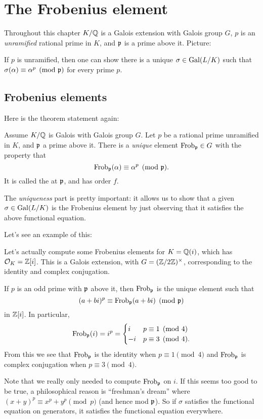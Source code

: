 \chapter{The Frobenius element}
Throughout this chapter $K/\mathbb Q$ is a Galois extension with Galois group $G$,
$p$ is an \emph{unramified} rational prime in $K$, and $\mathfrak p$ is a prime above it.
Picture:
\begin{center}
\end{center}
If $p$ is unramified, then one can show there
is a unique $\sigma \in \operatorname{Gal}(L/K)$ such that
$\sigma(\alpha) \equiv \alpha^p \pmod{\mathfrak p}$ for every prime $p$.

\section{Frobenius elements}

Here is the theorem statement again:
\begin{theorem}
	Assume $K/\mathbb Q$ is Galois with Galois group $G$.
	Let $p$ be a rational prime unramified in $K$, and $\mathfrak p$ a prime above it.
	There is a \emph{unique} element $\mathrm{Frob}_\mathfrak p \in G$
	with the property that
	\[ \mathrm{Frob}_\mathfrak p(\alpha) \equiv \alpha^{p} \pmod{\mathfrak p}. \]
	It is called the  at $\mathfrak p$, and has order $f$.
\end{theorem}
The \emph{uniqueness} part is pretty important:
it allows us to show that a given $\sigma \in \operatorname{Gal}(L/K)$
is the Frobenius element by just observing that it satisfies
the above functional equation.

Let's see an example of this:
\begin{example}
	Let's actually compute some Frobenius elements for $K = \mathbb Q(i)$,
	which has $\mathcal O_K = \mathbb Z[i]$.
	This is a Galois extension, with $G = (\mathbb Z/2\mathbb Z)^\times$,
	corresponding to the identity and complex conjugation.

	If $p$ is an odd prime with $\mathfrak p$ above it,
	then $\mathrm{Frob}_\mathfrak p$ is the unique element such that
	\[ (a+bi)^p \equiv \mathrm{Frob}_\mathfrak p(a+bi) \pmod{\mathfrak p} \]
	in $\mathbb Z[i]$. In particular,
	\[ \mathrm{Frob}_\mathfrak p(i) = i^p = 
		\begin{cases}
			i & p \equiv 1 \pmod 4 \\
			-i & p \equiv 3 \pmod 4.
		\end{cases}
	\]
	From this we see that $\mathrm{Frob}_\mathfrak p$ is the identity when $p \equiv 1 \pmod 4$
	and $\mathrm{Frob}_\mathfrak p$ is complex conjugation when $p \equiv 3 \pmod 4$.
\end{example}
Note that we really only needed to compute $\mathrm{Frob}_\mathfrak p$ on $i$.
If this seems too good to be true,
a philosophical reason is ``freshman's dream''
where $(x+y)^p \equiv x^p + y^p \pmod{p}$ (and hence mod $\mathfrak p$).
So if $\sigma$ satisfies the functional equation on generators,
it satisfies the functional equation everywhere.

